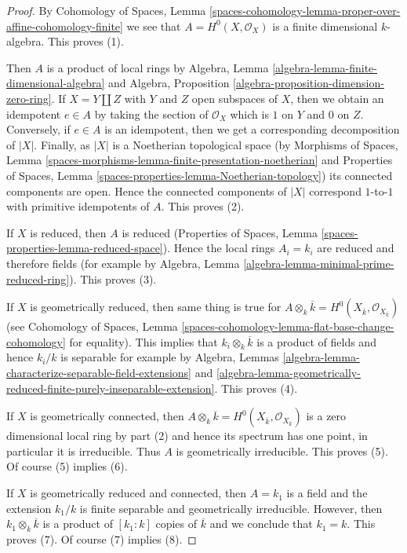 \begin{proof}
By Cohomology of Spaces, Lemma
\ref{spaces-cohomology-lemma-proper-over-affine-cohomology-finite}
we see that $A = H^0(X, \mathcal{O}_X)$ is a finite dimensional
$k$-algebra. This proves (1).

\medskip\noindent
Then $A$ is a product of local rings by
Algebra, Lemma \ref{algebra-lemma-finite-dimensional-algebra} and
Algebra, Proposition \ref{algebra-proposition-dimension-zero-ring}.
If $X = Y \amalg Z$ with $Y$ and $Z$ open subspaces of $X$, then we obtain
an idempotent $e \in A$ by taking the section of $\mathcal{O}_X$
which is $1$ on $Y$ and $0$ on $Z$. Conversely, if $e \in A$
is an idempotent, then we get a corresponding decomposition of $|X|$.
Finally, as $|X|$ is a Noetherian topological space
(by Morphisms of Spaces, Lemma
\ref{spaces-morphisms-lemma-finite-presentation-noetherian} and
Properties of Spaces, Lemma
\ref{spaces-properties-lemma-Noetherian-topology})
its connected components are open. Hence the connected components
of $|X|$ correspond $1$-to-$1$ with primitive idempotents of $A$.
This proves (2).

\medskip\noindent
If $X$ is reduced, then $A$ is reduced
(Properties of Spaces, Lemma \ref{spaces-properties-lemma-reduced-space}).
Hence the local rings $A_i = k_i$ are reduced and therefore fields
(for example by Algebra, Lemma \ref{algebra-lemma-minimal-prime-reduced-ring}).
This proves (3).

\medskip\noindent
If $X$ is geometrically reduced, then same thing is true for
$A \otimes_k \overline{k} =
H^0(X_{\overline{k}}, \mathcal{O}_{X_{\overline{k}}})$
(see Cohomology of Spaces, Lemma
\ref{spaces-cohomology-lemma-flat-base-change-cohomology} for equality).
This implies that $k_i \otimes_k \overline{k}$ is a product
of fields and hence $k_i/k$ is separable for example by
Algebra,
Lemmas \ref{algebra-lemma-characterize-separable-field-extensions} and
\ref{algebra-lemma-geometrically-reduced-finite-purely-inseparable-extension}.
This proves (4).

\medskip\noindent
If $X$ is geometrically connected, then $A \otimes_k \overline{k} =
H^0(X_{\overline{k}}, \mathcal{O}_{X_{\overline{k}}})$
is a zero dimensional local ring by part (2) and hence its
spectrum has one point, in particular it is irreducible.
Thus $A$ is geometrically irreducible. This proves (5).
Of course (5) implies (6).

\medskip\noindent
If $X$ is geometrically reduced and connected, then
$A = k_1$ is a field and the extension $k_1/k$ is finite separable and
geometrically irreducible. However, then $k_1 \otimes_k \overline{k}$
is a product of $[k_1 : k]$ copies of $\overline{k}$ and we conclude
that $k_1 = k$. This proves (7). Of course (7) implies (8).
\end{proof}

